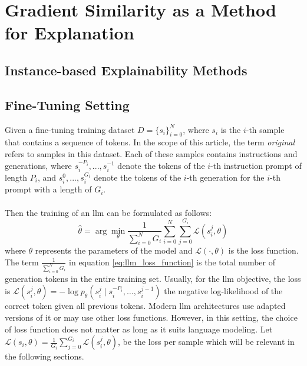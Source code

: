 \chapter{Gradient Similarity as a Method for Explanation}\label{cha:gradient_similarity}

\section{Instance-based Explainability Methods}

\section{Fine-Tuning Setting}\label{sec:fine_tuning_setting}
Given a fine-tuning training dataset $D = \{s_i\}_{i=0}^N$, where $s_i$ is the $i$-th sample that contains a sequence of tokens. In the scope of this article, the term \emph{original} refers to samples in this dataset. Each of these samples contains instructions and generations, where $s_i^{-P_i},...,s_i^{-1}$ denote the tokens of the $i$-th instruction prompt of length $P_i$, and $s_i^0,...,s_i^{G_i}$ denote the tokens of the $i$-th generation for the $i$-th prompt with a length of $G_i$.
\\\\
Then the training of an \acrshort{llm} can be formulated as follows: 
\begin{equation}
    \hat{\theta} = \arg\min_{\theta} \frac{1}{\sum_{i=0}^{N} G_i} \sum_{i=0}^{N} \sum_{j=0}^{G_i} \mathcal{L}(s_i^j, \theta)
    \label{eq:llm_loss_function}
\end{equation}
where $\theta$ represents the parameters of the model and $\mathcal{L}(\cdot, \theta)$ is the loss function. The term $\frac{1}{\sum_{i=0}^{N} G_i}$ in equation \ref{eq:llm_loss_function} is the total number of generation tokens in the entire training set. Usually, for the \acrshort{llm} objective, the loss is $\mathcal{L}(s_i^j, \theta) = -\log p_\theta(s_i^j \mid s_i^{-P_i}, \ldots, s_i^{j-1})$ the negative log-likelihood of the correct token given all previous tokens.  Modern \acrshort{llm} architectures use adapted versions of it or may use other loss functions. However, in this setting, the choice of loss function does not matter as long as it suits language modeling. Let $\mathcal{L}(s_i, \theta) = \frac{1}{G_i} \sum_{j=0}^{G_i} \mathcal{L}(s_i^j, \theta)$, be the loss per sample which will be relevant in the following sections.
